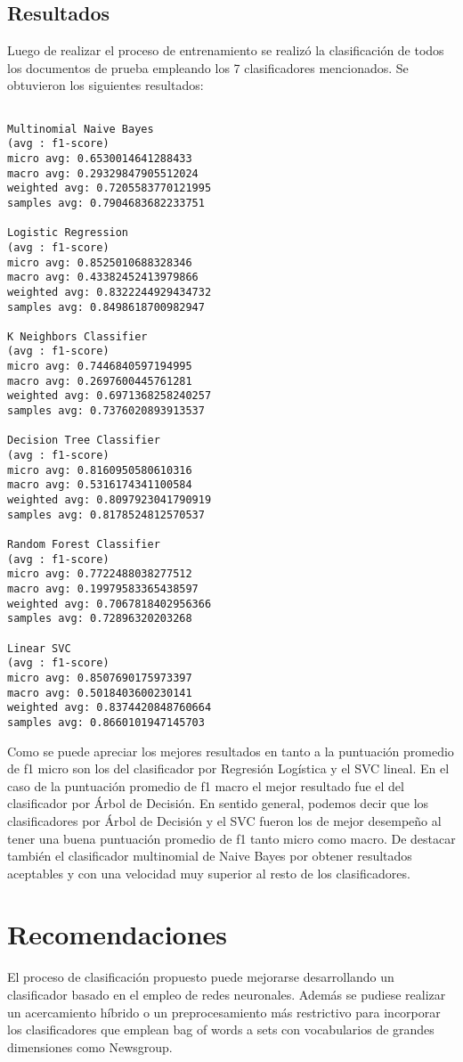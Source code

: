 \documentclass[12pt]{llncs}
\begin{document}
\subsection {Resultados}

Luego de realizar el proceso de entrenamiento se realizó la clasificación de todos los documentos de prueba empleando los 7 clasificadores mencionados. Se obtuvieron los siguientes resultados:

\begin{verbatim}

Multinomial Naive Bayes
(avg : f1-score)
micro avg: 0.6530014641288433
macro avg: 0.29329847905512024
weighted avg: 0.7205583770121995
samples avg: 0.7904683682233751

Logistic Regression
(avg : f1-score)
micro avg: 0.8525010688328346
macro avg: 0.43382452413979866
weighted avg: 0.8322244929434732
samples avg: 0.8498618700982947

K Neighbors Classifier
(avg : f1-score)
micro avg: 0.7446840597194995
macro avg: 0.2697600445761281
weighted avg: 0.6971368258240257
samples avg: 0.7376020893913537

Decision Tree Classifier
(avg : f1-score)
micro avg: 0.8160950580610316
macro avg: 0.5316174341100584
weighted avg: 0.8097923041790919
samples avg: 0.8178524812570537

Random Forest Classifier
(avg : f1-score)
micro avg: 0.7722488038277512
macro avg: 0.19979583365438597
weighted avg: 0.7067818402956366
samples avg: 0.72896320203268

Linear SVC
(avg : f1-score)
micro avg: 0.8507690175973397
macro avg: 0.5018403600230141
weighted avg: 0.8374420848760664
samples avg: 0.8660101947145703

\end{verbatim}

\par Como se puede apreciar los mejores resultados en tanto a la puntuación promedio de f1 micro son los del clasificador por Regresión Logística y el SVC lineal. En el caso de la puntuación promedio de f1 macro el mejor resultado fue el del clasificador por Árbol de Decisión. En sentido general, podemos decir que los clasificadores por Árbol de Decisión y el SVC fueron los de mejor desempeño al tener una buena puntuación promedio de f1 tanto micro como macro. De destacar también el clasificador multinomial de Naive Bayes por  obtener resultados aceptables y con una velocidad muy superior al resto de los clasificadores.


\section*{Recomendaciones}

El proceso de clasificación propuesto puede mejorarse desarrollando un clasificador basado en el empleo de redes neuronales. Además se pudiese realizar un acercamiento híbrido o un preprocesamiento más restrictivo para incorporar los clasificadores que emplean bag of words a sets con vocabularios de grandes dimensiones como Newsgroup.



 

\end{document}

